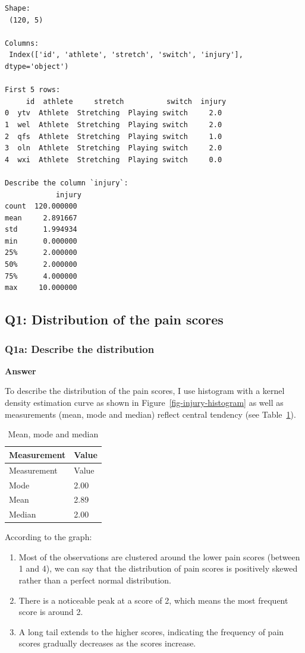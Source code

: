 \documentclass[
  a4paper,
  DIV=11,
  numbers=noendperiod]{scrartcl}
\providecommand{\tightlist}{%
  \setlength{\itemsep}{0pt}\setlength{\parskip}{0pt}}\usepackage{longtable,booktabs,array}
\begin{document}
\begin{verbatim}
Shape: 
 (120, 5) 

Columns: 
 Index(['id', 'athlete', 'stretch', 'switch', 'injury'], dtype='object') 

First 5 rows: 
     id  athlete     stretch          switch  injury
0  ytv  Athlete  Stretching  Playing switch     2.0
1  wel  Athlete  Stretching  Playing switch     2.0
2  qfs  Athlete  Stretching  Playing switch     1.0
3  oln  Athlete  Stretching  Playing switch     2.0
4  wxi  Athlete  Stretching  Playing switch     0.0 

Describe the column `injury`: 
            injury
count  120.000000
mean     2.891667
std      1.994934
min      0.000000
25%      2.000000
50%      2.000000
75%      4.000000
max     10.000000 
\end{verbatim}

\subsection{Q1: Distribution of the pain
scores}\label{q1-distribution-of-the-pain-scores}

\subsubsection{Q1a: Describe the
distribution}\label{q1a-describe-the-distribution}

\textbf{Answer}

To describe the distribution of the pain scores, I use histogram with a
kernel density estimation curve as shown in
Figure~\ref{fig-injury-histogram} as well as measurements (mean, mode
and median) reflect central tendency (see Table~\ref{tbl-centrality}).

\begin{longtable}[]{@{}ll@{}}
\caption{Mean, mode and median}\label{tbl-centrality}\tabularnewline
\toprule\noalign{}
Measurement & Value \\
\midrule\noalign{}
\endfirsthead
\toprule\noalign{}
Measurement & Value \\
\midrule\noalign{}
\endhead
\bottomrule\noalign{}
\endlastfoot
Mode & 2.00 \\
Mean & 2.89 \\
Median & 2.00 \\
\end{longtable}

According to the graph:

\begin{enumerate}
\def\labelenumi{\arabic{enumi}.}
\tightlist
\item
  Most of the observations are clustered around the lower pain scores
  (between 1 and 4), we can say that the distribution of pain scores is
  positively skewed rather than a perfect normal distribution.
\item
  There is a noticeable peak at a score of 2, which means the most
  frequent score is around 2.
\item
  A long tail extends to the higher scores, indicating the frequency of
  pain scores gradually decreases as the scores increase.
\end{enumerate}
\end{document}
